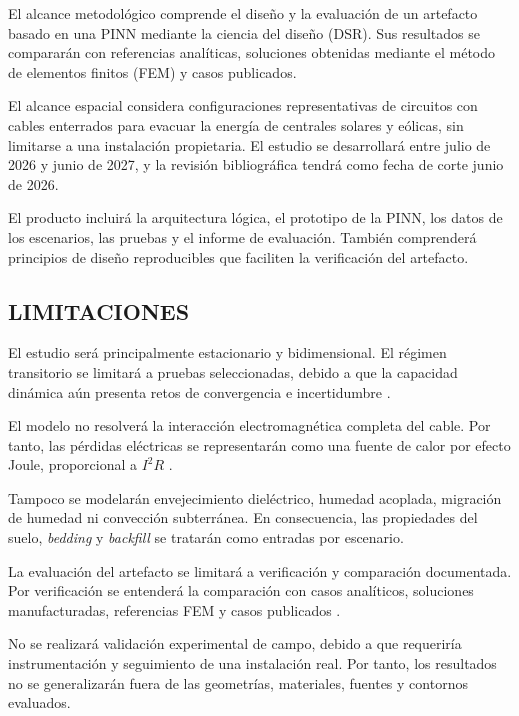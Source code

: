 \documentclass[11pt,a4paper,oneside]{report}
\begin{document}
El alcance metodológico comprende el diseño y la evaluación de un artefacto basado en una PINN mediante la ciencia del diseño (DSR). Sus resultados se compararán con referencias analíticas, soluciones obtenidas mediante el método de elementos finitos (FEM) y casos publicados.

El alcance espacial considera configuraciones representativas de circuitos con cables enterrados para evacuar la energía de centrales solares y eólicas, sin limitarse a una instalación propietaria. El estudio se desarrollará entre julio de 2026 y junio de 2027, y la revisión bibliográfica tendrá como fecha de corte junio de 2026.

El producto incluirá la arquitectura lógica, el prototipo de la PINN, los datos de los escenarios, las pruebas y el informe de evaluación. También comprenderá principios de diseño reproducibles que faciliten la verificación del artefacto.

\subsection{LIMITACIONES}

El estudio será principalmente estacionario y bidimensional. El régimen transitorio se limitará a pruebas seleccionadas, debido a que la capacidad dinámica aún presenta retos de convergencia e incertidumbre \parencite[14851--14852]{fariz2026}.

El modelo no resolverá la interacción electromagnética completa del cable. Por tanto, las pérdidas eléctricas se representarán como una fuente de calor por efecto Joule, proporcional a $I^2R$ \parencites[752--760]{neher1957}[cláusulas 4--5]{iec60287}.

Tampoco se modelarán envejecimiento dieléctrico, humedad acoplada, migración de humedad ni convección subterránea. En consecuencia, las propiedades del suelo, \textit{bedding} y \textit{backfill} se tratarán como entradas por escenario.

La evaluación del artefacto se limitará a verificación y comparación documentada. Por verificación se entenderá la comparación con casos analíticos, soluciones manufacturadas, referencias FEM y casos publicados \parencites{cigre2022}[3--4,93--99]{cigre2025}.

No se realizará validación experimental de campo, debido a que requeriría instrumentación y seguimiento de una instalación real. Por tanto, los resultados no se generalizarán fuera de las geometrías, materiales, fuentes y contornos evaluados.
\end{document}
